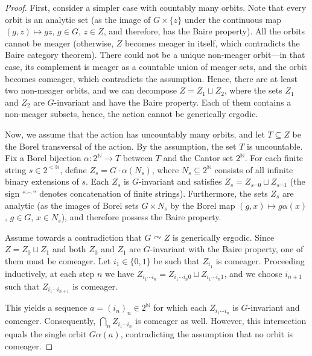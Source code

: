 \documentclass[12pt]{paper}
\numberwithin{equation}{section}
\theoremstyle{plain}
\theoremstyle{definition}
\newcommand{\N}{\mathbb{N}}
\newcommand{\acts}{\curvearrowright}
\newcommand{\concat}{{}^{\frown}}
\newcommand{\say}[1]{``#1''}
\begin{document}
\begin{proof}
  First, consider a simpler case with countably many orbits. Note that every orbit is an analytic
  set (as the image of \(G\times\{z\}\) under the continuous map \((g, z)\mapsto gz\), \(g\in G\),
  \(z\in Z\), and therefore, has the Baire property).  All the orbits cannot be meager (otherwise,
  \(Z\) becomes meager in itself, which contradicts the Baire category theorem). There could not be
  a unique non-meager orbit---in that case, its complement is meager as a countable union of meager
  sets, and the orbit becomes comeager, which contradicts the assumption. Hence, there are at least
  two non-meager orbits, and we can decompose \(Z=Z_1 \sqcup Z_2\), where the sets \(Z_1\) and
  \(Z_2\) are \(G\)-invariant and have the Baire property.  Each of them contains a non-meager
  subsets, hence, the action cannot be generically ergodic.

  Now, we assume that the action has uncountably many orbits, and let \(T \subseteq Z\) be the Borel
  transversal of the action.  By the assumption, the set \(T\) is uncountable.  Fix a Borel
  bijection \(\alpha : 2^{\N} \to T\) between \(T\) and the Cantor set \(2^{\N}\). For each finite
  string \(s \in 2^{<\N}\), define \(Z_{s} = G \cdot \alpha(N_{s})\), where
  \(N_{s} \subseteq 2^{\N}\) consists of all infinite binary extensions of \(s\). Each \(Z_{s}\) is
  \(G\)-invariant and satisfies \(Z_{s} = Z_{s \concat 0} \sqcup Z_{s \concat 1}\) (the sign
  \say{\( \concat \)} denotes concatenation of finite strings). Furthermore, the sets \(Z_{s}\) are
  analytic (as the images of Borel sets \(G\times N_s\) by the Borel map
  \((g, x) \mapsto g \alpha (x)\), \(g\in G\), \(x\in N_s\)), and therefore possess the Baire
  property.

  Assume towards a contradiction that \(G \acts Z\) is generically ergodic. Since
  \(Z = Z_{0} \sqcup Z_{1}\) and both \(Z_{0}\) and \(Z_{1}\) are \(G\)-invariant with the Baire
  property, one of them must be comeager. Let \(i_{1} \in \{0,1\}\) be such that \(Z_{i_{1}}\) is
  comeager. Proceeding inductively, at each step \(n\) we have
  \(Z_{i_{1}\cdots i_{n}} = Z_{i_{1}\cdots i_{n}0} \sqcup Z_{i_{1}\cdots i_{n}1}\), and we choose
  \(i_{n+1}\) such that \(Z_{i_{1}\cdots i_{n+1}}\) is comeager.

  This yields a sequence \(a = (i_{n})_{n} \in 2^{\N}\) for which each \(Z_{i_{1}\cdots i_{n}}\) is
  \(G\)-invariant and comeager. Consequently, \(\bigcap_{n} Z_{i_{1}\cdots i_{n}}\) is comeager as
  well. However, this intersection equals the single orbit \(G\alpha(a)\), contradicting the
  assumption that no orbit is comeager.
\end{proof}
\end{document}
